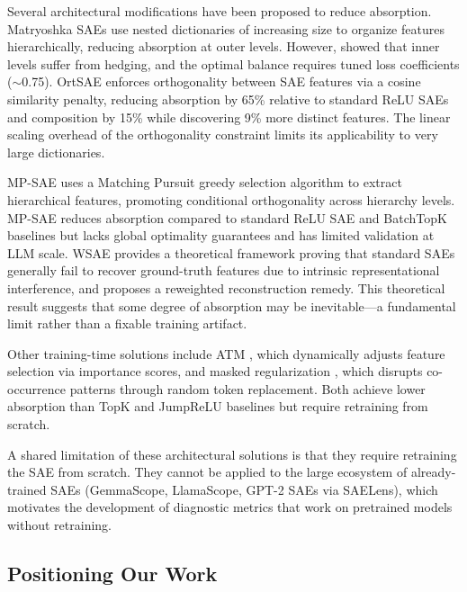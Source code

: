 \documentclass{article}
\begin{document}
Several architectural modifications have been proposed to reduce absorption. Matryoshka SAEs \citep{bussmann2025matryoshka} use nested dictionaries of increasing size to organize features hierarchically, reducing absorption at outer levels. However, \citet{chanin2025ahedging} showed that inner levels suffer from hedging, and the optimal balance requires tuned loss coefficients ($\sim$0.75). OrtSAE \citep{korznikov2025ortsae} enforces orthogonality between SAE features via a cosine similarity penalty, reducing absorption by 65\% relative to standard ReLU SAEs and composition by 15\% while discovering 9\% more distinct features. The linear scaling overhead of the orthogonality constraint limits its applicability to very large dictionaries.

MP-SAE \citep{costa2025mpsae} uses a Matching Pursuit greedy selection algorithm to extract hierarchical features, promoting conditional orthogonality across hierarchy levels. MP-SAE reduces absorption compared to standard ReLU SAE and BatchTopK baselines but lacks global optimality guarantees and has limited validation at LLM scale. WSAE \citep{cui2026wsae} provides a theoretical framework proving that standard SAEs generally fail to recover ground-truth features due to intrinsic representational interference, and proposes a reweighted reconstruction remedy. This theoretical result suggests that some degree of absorption may be inevitable---a fundamental limit rather than a fixable training artifact.

Other training-time solutions include ATM \citep{li2025atm}, which dynamically adjusts feature selection via importance scores, and masked regularization \citep{narayanaswamy2026masked}, which disrupts co-occurrence patterns through random token replacement. Both achieve lower absorption than TopK and JumpReLU baselines but require retraining from scratch.

A shared limitation of these architectural solutions is that they require retraining the SAE from scratch. They cannot be applied to the large ecosystem of already-trained SAEs (GemmaScope, LlamaScope, GPT-2 SAEs via SAELens), which motivates the development of diagnostic metrics that work on pretrained models without retraining.

\subsection{Positioning Our Work}
\end{document}
